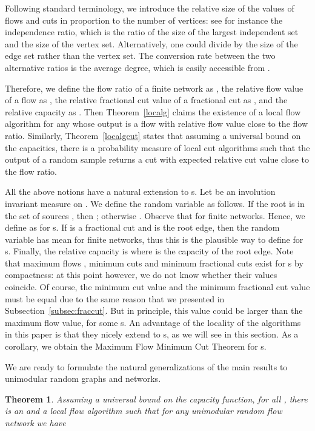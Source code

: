 \documentclass[12pt,a4paper]{article}
\newtheorem{Theorem}{Theorem}
\renewcommand{\:}{\colon}
\begin{document}
Following standard terminology, we introduce the relative size of the values of flows and cuts in proportion to the number of vertices: see for instance the independence ratio, which is the ratio of the size of the largest independent set and the size of the vertex set. 
Alternatively, one could divide by the size of the edge set rather than the vertex set. 
The conversion rate between the two alternative ratios is the average degree, which is easily accessible from . 


Therefore, we define the flow ratio of a finite network  as , the relative flow value of a flow  as , the relative fractional cut value of a fractional cut  as , and the relative capacity as . 
Then Theorem~\ref{localg} claims the existence of a local flow algorithm for any  whose output is a flow with relative flow value  close to the flow ratio. 
Similarly, Theorem~\ref{localgcut} states that assuming a universal bound on the capacities, there is a probability measure of local cut algorithms such that the output of a random sample returns a cut with expected relative cut value  close to the flow ratio. 

All the above notions have a natural extension to s. 
Let  be an involution invariant measure on . 
We define the random variable  as follows. 
If the root  is in the set of sources , then ; otherwise . 
Observe that  for finite networks. 
Hence, we define  as  for s. 
If  is a fractional cut and  is the root edge, then the random variable  has mean  for finite networks, thus this is the plausible way to define  for s. 
Finally, the relative capacity is  where  is the capacity of the root edge. 
Note that maximum flows , minimum cuts and minimum fractional cuts exist for s by compactness: at this point however, we do not know whether their values coincide. 
Of course, the minimum cut value and the minimum fractional cut value must be equal due to the same reason that we presented in Subsection~\ref{subsec:fraccut}. 
But in principle, this value could be larger than the maximum flow value, for some s. 
An advantage of the locality of the algorithms in this paper is that they nicely extend to s, as we will see in this section. 
As a corollary, we obtain the Maximum Flow Minimum Cut Theorem for s. 



We are ready to formulate the natural generalizations of the main results to unimodular random graphs and networks. 

\begin{Theorem}\label{localgflowuni}
Assuming a universal bound  on the capacity function, for all , there is an  and a local flow algorithm  such that for any unimodular random flow network  we have

\end{Theorem}
\end{document}
